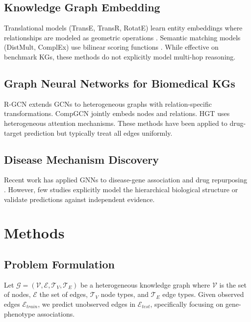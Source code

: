\documentclass[twoside]{article}
\begin{document}
\subsection{Knowledge Graph Embedding}

Translational models (TransE, TransR, RotatE) learn entity embeddings where relationships are modeled as geometric operations \citep{bordes2013transe}. Semantic matching models (DistMult, ComplEx) use bilinear scoring functions \citep{yang2015distmult}. While effective on benchmark KGs, these methods do not explicitly model multi-hop reasoning.

\subsection{Graph Neural Networks for Biomedical KGs}

R-GCN \citep{schlichtkrull2018rgcn} extends GCNs to heterogeneous graphs with relation-specific transformations. CompGCN \citep{vashishth2020compgcn} jointly embeds nodes and relations. HGT \citep{hu2020hgt} uses heterogeneous attention mechanisms. These methods have been applied to drug-target prediction \citep{zhang2022graph} but typically treat all edges uniformly.

\subsection{Disease Mechanism Discovery}

Recent work has applied GNNs to disease-gene association \citep{} and drug repurposing \citep{}. However, few studies explicitly model the hierarchical biological structure or validate predictions against independent evidence.

\section{Methods}

\subsection{Problem Formulation}

Let $\mathcal{G} = (\mathcal{V}, \mathcal{E}, \mathcal{T}_V, \mathcal{T}_E)$ be a heterogeneous knowledge graph where $\mathcal{V}$ is the set of nodes, $\mathcal{E}$ the set of edges, $\mathcal{T}_V$ node types, and $\mathcal{T}_E$ edge types. Given observed edges $\mathcal{E}_{train}$, we predict unobserved edges in $\mathcal{E}_{test}$, specifically focusing on gene-phenotype associations.
\end{document}
